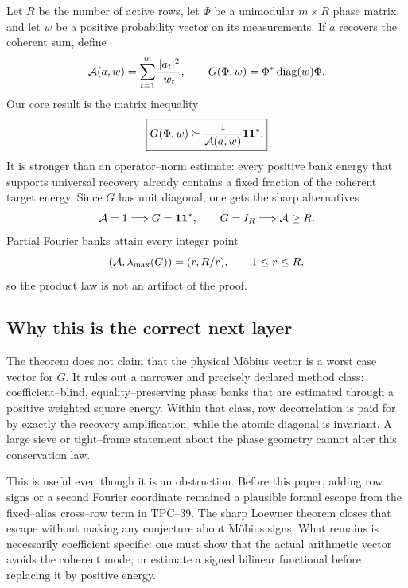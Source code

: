 Let \(R\) be the number of active rows, let \(\Phi\) be a unimodular
\(m\times R\) phase matrix, and let \(w\) be a positive probability
vector on its measurements.  If \(a\) recovers the coherent sum, define
\begin{equation}
 \mathcal A(a,w)=\sum_{t=1}^{m}\frac{|a_t|^2}{w_t},
 \qquad
 G(\Phi,w)=\Phi^*\operatorname{diag}(w)\Phi.
 \label{eq:tpc40-intro-A-G}
\end{equation}
Our core result is the matrix inequality
\begin{equation}
 \boxed{
 G(\Phi,w)\succeq
 \frac1{\mathcal A(a,w)}\mathbf 1\mathbf 1^*.}
 \label{eq:tpc40-intro-Loewner}
\end{equation}
It is stronger than an operator--norm estimate: every positive bank
energy that supports universal recovery already contains a fixed fraction
of the coherent target energy.  Since \(G\) has unit diagonal, one gets
the sharp alternatives
\begin{equation}
 \mathcal A=1\Longrightarrow G=\mathbf 1\mathbf 1^*,
 \qquad
 G=I_R\Longrightarrow\mathcal A\ge R.
 \label{eq:tpc40-intro-rigidity}
\end{equation}
Partial Fourier banks attain every integer point
\begin{equation}
 (\mathcal A,\lambda_{\max}(G))=(r,R/r),
 \qquad 1\le r\le R,
 \label{eq:tpc40-intro-frontier}
\end{equation}
so the product law is not an artifact of the proof.

\subsection{Why this is the correct next layer}

The theorem does not claim that the physical M\"obius vector is a worst
case vector for \(G\).  It rules out a narrower and precisely declared
method class: coefficient--blind, equality--preserving phase banks that
are estimated through a positive weighted square energy.  Within that
class, row decorrelation is paid for by exactly the recovery
amplification, while the atomic diagonal is invariant.  A large sieve or
tight--frame statement about the phase geometry cannot alter this
conservation law.

This is useful even though it is an obstruction.  Before this paper,
adding row signs or a second Fourier coordinate remained a plausible
formal escape from the fixed--alias cross--row term in TPC--39.  The sharp
Loewner theorem closes that escape without making any conjecture about
M\"obius signs.  What remains is necessarily coefficient specific: one
must show that the actual arithmetic vector avoids the coherent mode, or
estimate a signed bilinear functional before replacing it by positive
energy.

